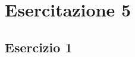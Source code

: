 \documentclass{article}
\begin{document}
	\section{Esercitazione 5}
	\subsection{Esercizio 1}

	
	
\end{document}
